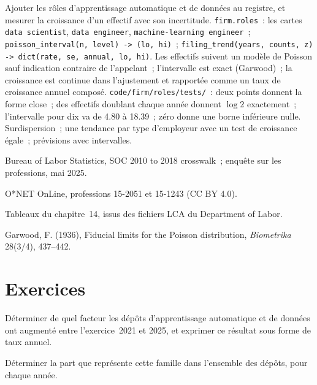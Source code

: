 \begin{build}
 Ajouter les rôles d'apprentissage automatique et de données au registre, et mesurer la croissance d'un effectif avec
son incertitude.
 \texttt{firm.roles}~: les cartes \texttt{data scientist}, \texttt{data engineer},
\texttt{machine-learning engineer}~; \texttt{poisson\_interval(n, level) -> (lo, hi)}~;
\texttt{filing\_trend(years, counts, z) -> dict(rate, se, annual, lo, hi)}.
 Les effectifs suivent un modèle de Poisson sauf indication contraire de l'appelant~; l'intervalle est exact (Garwood)~; la croissance est
continue dans l'ajustement et rapportée comme un taux de croissance annuel composé.
 \texttt{code/firm/roles/tests/}~: deux points donnent la forme close~; des effectifs doublant chaque année donnent
$\log 2$ exactement~; l'intervalle pour dix va de 4.80 à 18.39~; zéro donne une borne inférieure nulle.
 Surdispersion~; une tendance par type d'employeur avec un test de croissance égale~; prévisions avec intervalles.
\end{build}

\begin{omsources}
\item Bureau of Labor Statistics, SOC 2010 to 2018 crosswalk~; enquête sur les professions, mai 2025.
\item O*NET OnLine, professions 15-2051 et 15-1243 (CC BY 4.0).
\item Tableaux du chapitre~14, issus des fichiers LCA du Department of Labor.
\item Garwood, F. (1936), Fiducial limits for the Poisson distribution, \emph{Biometrika} 28(3/4), 437--442.
\end{omsources}

\section{Exercices}

\begin{exercise}[$\star$]\label{exo:in:machine-learning-and-data-engineer:1}
Déterminer de quel facteur les dépôts d'apprentissage automatique et de données ont augmenté entre l'exercice~2021 et 2025, et
exprimer ce résultat sous forme de taux annuel.
\end{exercise}

\begin{exercise}[$\star$]\label{exo:in:machine-learning-and-data-engineer:2}
Déterminer la part que représente cette famille dans l'ensemble des dépôts, pour chaque année.
\end{exercise}

